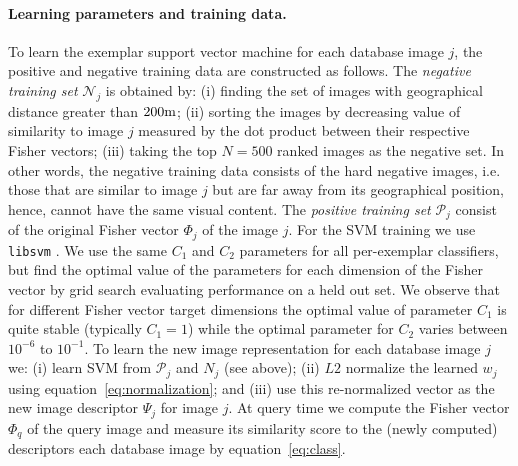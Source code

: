 \documentclass[table]{article} %
\begin{document}
\paragraph{Learning parameters and training data.}
			To learn the exemplar support vector machine for each database image $j$, the positive and negative training data are constructed as follows. 
			The \emph{negative training set} $\mathcal N_j$ is obtained by: (i) finding the set of images with geographical distance greater than $200{\rm m}$; (ii)  sorting the images by decreasing value of similarity to image $j$ measured by the dot product between their respective Fisher vectors; (iii) taking the top $N=500$ ranked images as the negative set. 
			In other words, the negative training data consists of the hard negative images, i.e. those that are similar to image $j$ but are far away from its geographical position, hence, cannot have the same visual content. The \emph{positive training set} $\mathcal P_j$
			 consist of the original Fisher vector $\Phi_j$ of the image $j$.
			For the SVM training we use {\tt libsvm} \cite{libsvm}. %
			 We use the same $C_1$ and $C_2$ parameters for all per-exemplar classifiers, but find the optimal value of the parameters for each dimension of the Fisher vector by grid search evaluating performance on a held out set.
			 We observe that for different Fisher vector target dimensions the optimal value of parameter $C_1$ is quite stable (typically $C_1=1$) while the optimal parameter for $C_2$ varies between $10^{-6}$ to $10^{-1}$.
			To learn the new image representation for each database image $j$ we: (i) learn SVM from $\mathcal P_j$ and $N_j$ (see above); (ii) $L2$ normalize the learned $w_j$ using equation~\eqref{eq:normalization}; and (iii) use this re-normalized vector as the new image descriptor $\Psi_j$ for image $j$. At query time we compute the Fisher vector $\Phi_q$ of the query image and measure its similarity score to the (newly computed) descriptors each database image by equation~\eqref{eq:class}.
		
\end{document}
